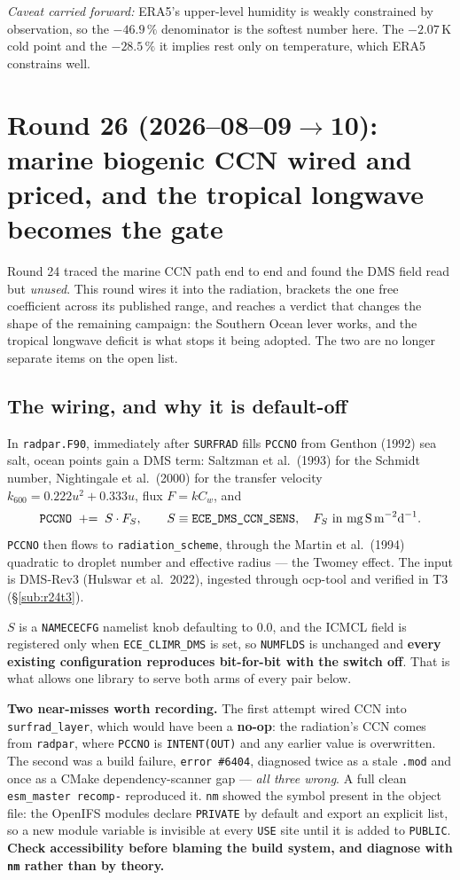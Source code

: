 \documentclass[10pt]{article}
\begin{document}
\emph{Caveat carried forward:} ERA5's upper-level humidity is weakly constrained by
observation, so the $-46.9\,\%$ denominator is the softest number here. The $-2.07$\,K cold
point and the $-28.5\,\%$ it implies rest only on temperature, which ERA5 constrains well.

\section{Round 26 (2026--08--09$\to$10): marine biogenic CCN wired and priced, and the
tropical longwave becomes the gate}\label{sec:r26}
Round 24 traced the marine CCN path end to end and found the DMS field read but
\emph{unused}. This round wires it into the radiation, brackets the one free coefficient
across its published range, and reaches a verdict that changes the shape of the remaining
campaign: the Southern Ocean lever works, and the tropical longwave deficit is what stops
it being adopted. The two are no longer separate items on the open list.

\subsection{The wiring, and why it is default-off}\label{sub:r26wire}
In \texttt{radpar.F90}, immediately after \texttt{SURFRAD} fills \texttt{PCCNO} from
Genthon (1992) sea salt, ocean points gain a DMS term:
Saltzman et al.\ (1993) for the Schmidt number, Nightingale et al.\ (2000) for the
transfer velocity $k_{600}=0.222u^2+0.333u$, flux $F=kC_w$, and
\[
  \texttt{PCCNO} \;\mathrel{+}=\; S \cdot F_S , \qquad
  S \equiv \texttt{ECE\_DMS\_CCN\_SENS},\quad F_S \ \text{in mg\,S\,m}^{-2}\text{d}^{-1}.
\]
\texttt{PCCNO} then flows to \texttt{radiation\_scheme}, through the Martin et al.\ (1994)
quadratic to droplet number and effective radius --- the Twomey effect. The input is
DMS-Rev3 (Hulswar et al.\ 2022), ingested through ocp-tool and verified in T3
(\S\ref{sub:r24t3}).

$S$ is a \texttt{NAMECECFG} namelist knob defaulting to $0.0$, and the ICMCL field is
registered only when \texttt{ECE\_CLIMR\_DMS} is set, so \texttt{NUMFLDS} is unchanged and
\textbf{every existing configuration reproduces bit-for-bit with the switch off}. That is
what allows one library to serve both arms of every pair below.

\textbf{Two near-misses worth recording.} The first attempt wired CCN into
\texttt{surfrad\_layer}, which would have been a \textbf{no-op}: the radiation's CCN comes
from \texttt{radpar}, where \texttt{PCCNO} is \texttt{INTENT(OUT)} and any earlier value is
overwritten. The second was a build failure, \texttt{error \#6404}, diagnosed twice as a
stale \texttt{.mod} and once as a CMake dependency-scanner gap --- \emph{all three wrong}. A
full clean \texttt{esm\_master recomp-} reproduced it. \texttt{nm} showed the symbol present
in the object file: the OpenIFS modules declare \texttt{PRIVATE} by default and export an
explicit list, so a new module variable is invisible at every \texttt{USE} site until it is
added to \texttt{PUBLIC}. \textbf{Check accessibility before blaming the build system, and
diagnose with \texttt{nm} rather than by theory.}
\end{document}
